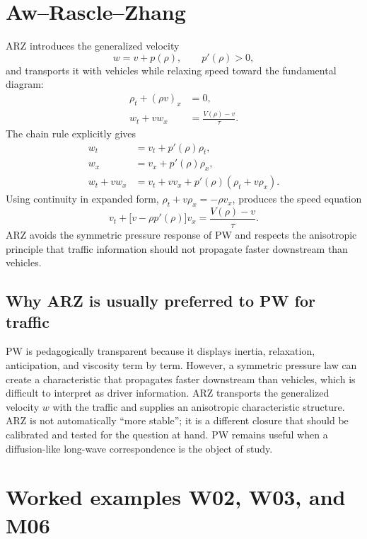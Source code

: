 \documentclass[11pt,a4paper,openany]{book}
\numberwithin{equation}{chapter}
\numberwithin{figure}{chapter}
\numberwithin{table}{chapter}
\begin{document}
\section{Aw--Rascle--Zhang}
ARZ introduces the generalized velocity \cite{aw2000,zhang2002}
\begin{equation}
w=v+p(\rho),\qquad p'(\rho)>0,
\end{equation}
and transports it with vehicles while relaxing speed toward the fundamental diagram:
\begin{align}
\rho_t+(\rho v)_x&=0,\\
w_t+vw_x&=\frac{V(\rho)-v}{\tau}.
\end{align}
The chain rule explicitly gives
\begin{align}
w_t&=v_t+p'(\rho)\rho_t,\\
w_x&=v_x+p'(\rho)\rho_x,\\
w_t+vw_x&=v_t+vv_x+p'(\rho)(\rho_t+v\rho_x).
\end{align}
Using continuity in expanded form, $\rho_t+v\rho_x=-\rho v_x$, produces the speed equation
\begin{equation}
v_t+\bigl[v-\rho p'(\rho)\bigr]v_x=\frac{V(\rho)-v}{\tau}.
\end{equation}
ARZ avoids the symmetric pressure response of PW and respects the anisotropic principle that traffic information should not propagate faster downstream than vehicles.

\subsection{Why ARZ is usually preferred to PW for traffic}
PW is pedagogically transparent because it displays inertia, relaxation, anticipation, and viscosity term by term. However, a symmetric pressure law can create a characteristic that propagates faster downstream than vehicles, which is difficult to interpret as driver information. ARZ transports the generalized velocity $w$ with the traffic and supplies an anisotropic characteristic structure. ARZ is not automatically ``more stable''; it is a different closure that should be calibrated and tested for the question at hand. PW remains useful when a diffusion-like long-wave correspondence is the object of study.

\section{Worked examples W02, W03, and M06}
\end{document}
